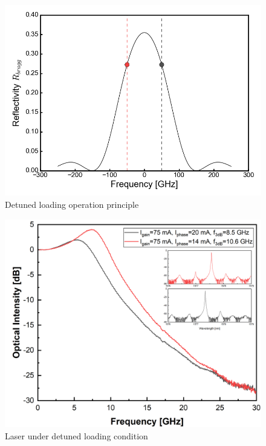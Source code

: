 \begin{figure}[ht]
    \centering
    \includegraphics[width=.7\linewidth]{figures/detuned_loading_principle.png}
    \caption{Detuned loading operation principle}
    \label{fig:detuned_loading_principle}
\end{figure}
\begin{figure}[!htb]
    \centering
    \includegraphics[width=.7\linewidth]{figures/detuned_loading.png}
    \caption{Laser under detuned loading condition}
    \label{fig:detuned_loading}
\end{figure}


